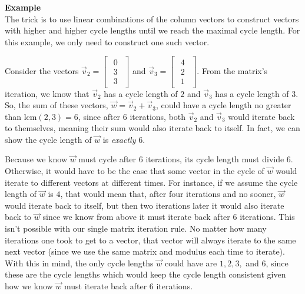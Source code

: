 \documentclass[a4paper, 12pt, reqno]{amsart}
\newcounter{mathexample}[section]
\newenvironment{mathexample}
{
	\refstepcounter{mathexample} %
	\textbf{Example \themathexample} 
	\\
}
{
	\vspace{1cm}
}
\begin{document}
\begin{mathexample}
		The trick is to use linear combinations of the column vectors to construct vectors with higher 
		and higher cycle lengths until we reach the maximal cycle length. For this example, we only need
		to construct one such vector.
		
		Consider the vectors 
		$\vec{v}_{2} =
			\begin{bmatrix}
				\begin{smallmatrix}
					0 \\
					3 \\
					3
				\end{smallmatrix}
			\end{bmatrix}
		$ and 
		$\vec{v}_{3} = 
			\begin{bmatrix}
				\begin{smallmatrix}
					4 \\
					2 \\
					1
				\end{smallmatrix}
			\end{bmatrix}$.
		From the matrix's iteration, we know that $\vec{v}_{2}$ has a cycle length of $2$ and
		$\vec{v}_{3}$ has a cycle length of $3$. So, the sum of these vectors, $\vec{w} = \vec{v}_{2} + 
		\vec{v}_3$, could have a cycle length no greater than $\text{lcm}(2, 3) = 6$, since after $6$ 
		iterations, both $\vec{v}_{2}$ and $\vec{v}_{3}$ would iterate back to themselves, meaning 
		their sum would also iterate back to itself. In fact, we can show the cycle length of $\vec{w}$ 
		is \emph{exactly} $6$. 
		
		Because we know $\vec{w}$ must cycle after $6$ iterations, its cycle length must divide $6$. 
		Otherwise, it would have to be the case that some vector in the cycle of $\vec{w}$ would iterate 
		to different vectors at different times. For instance, if we assume the cycle length of $\vec{w}$
		is $4$, that would mean that, after four iterations and no sooner, $\vec{w}$ would iterate back 
		to itself, but then two iterations later it would also iterate back to $\vec{w}$ since we know 
		from above it must iterate back after $6$ iterations. This isn't possible with our single matrix 
		iteration rule. No matter how many iterations one took to get to a vector, that vector will always 
		iterate to the same next vector (since we use the same matrix and modulus each time to iterate). 
		With this in mind, the only cycle lengths $\vec{w}$ could have are $1, 2, 3,$ and $6$, since these
		are the cycle lengths which would keep the cycle length consistent given how we know $\vec{w}$ must
		iterate back after $6$ iterations.
		

\end{mathexample}
\end{document}
